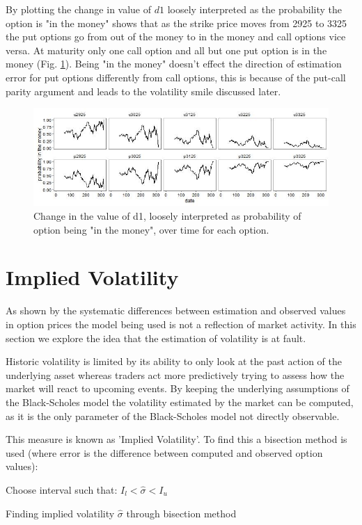 \documentclass{sig-alternate-05-2015}
\begin{document}
By plotting the change in value of $d1$ loosely interpreted as the probability the option is "in the money" shows that as the strike price moves from 2925 to 3325 the put options go from out of the money to in the money and call options vice versa. At maturity only one call option and all but one put option is in the money (Fig. \ref{fig:Q2_4}). Being "in the money" doesn't effect the direction of estimation error for put options differently from call options, this is because of the put-call parity argument and leads to the volatility smile discussed later. 

\begin{figure}[htbp]
	\includegraphics[width=\linewidth]{../Plots/Q2_4.jpg}
	\centering
	\caption{Change in the value of d1, loosely interpreted as probability of option being "in the money", over time for each option.}
			\label{fig:Q2_4}
\end{figure}

\section{Implied Volatility}
As shown by the systematic differences between estimation and observed values in option prices the model being used is not a reflection of market activity. In this section we explore the idea that the estimation of volatility is at fault. 

Historic volatility is limited by its ability to only look at the past action of the underlying asset whereas traders act more predictively trying to assess how the market will react to upcoming events. By keeping the underlying assumptions of the Black-Scholes model the volatility estimated by the market can be computed, as it is the only parameter of the Black-Scholes model not directly observable.   

This measure is known as 'Implied Volatility'. To find this a bisection method is used (where error is the difference between computed and observed option values): 

\begin{algorithm}
 Choose interval such that: $I_l < \hat{\sigma} < I_u$\; 
 
 \caption{Finding implied volatility $\hat{\sigma}$ through bisection method}
\end{algorithm}
\end{document}
